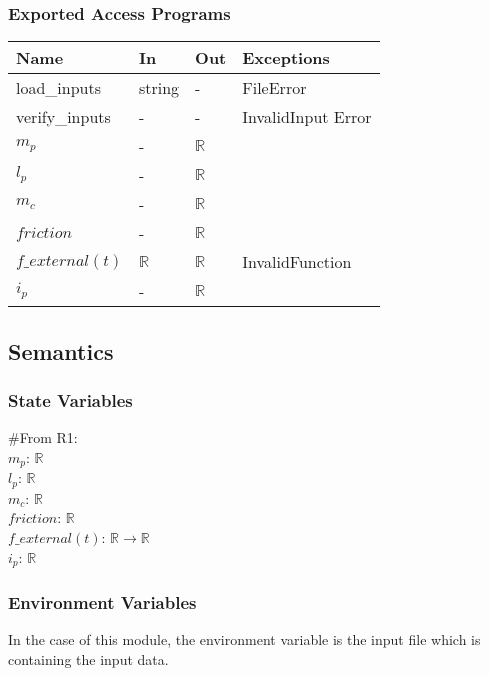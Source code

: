 \documentclass[12pt, titlepage]{article}
\begin{document}
\subsubsection{Exported Access Programs}

\begin{tabular}{p{3cm} p{2cm} p{2cm} >{\raggedright\arraybackslash}p{6cm}}
\toprule
\textbf{Name} & \textbf{In} & \textbf{Out} & \textbf{Exceptions} \\
\midrule
load\_inputs & string & - &  FileError \\
verify\_inputs & - & - & InvalidInput Error \\
$ m_p$ & - & $\mathbb{R}$\\
$l_p$ & - & $\mathbb{R}$\\
$m_c$ & - & $\mathbb{R}$\\
$friction$ & - & $\mathbb{R}$\\
$f\_external(t)$ & $\mathbb{R}$ & $\mathbb{R}$&InvalidFunction\\
$i_p$& - & $\mathbb{R}$\\
\bottomrule
\end{tabular}
\subsection{Semantics}

\subsubsection{State Variables}
\#From R1:\\
$ m_p$: $\mathbb{R}$\\
$l_p$: $\mathbb{R}$\\
$m_c$: $\mathbb{R}$\\
$friction$: $\mathbb{R}$\\
$f\_external(t)$: $\mathbb{R} \rightarrow \mathbb{R}$\\
$i_p$: $\mathbb{R}$

\subsubsection{Environment Variables}
In the case of this module, the environment variable is the input file which is containing the input data.
\end{document}

